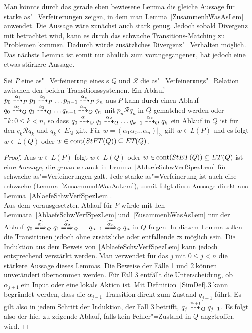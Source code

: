 Man könnte durch das gerade eben bewiesene Lemma die gleiche Aussage für starke
as"=Verfeinerungen zeigen, in dem man Lemma~\ref{ZusammenhWasAsLem} anwendet.
Die Aussage wäre zunächst auch stark genug. Jedoch sobald Divergenz mit
betrachtet wird, kann es durch das schwache Transitions-Matching zu Problemen
kommen. Dadurch würde zusätzliches Divergenz"=Verhalten möglich. Das nächste
Lemma ist somit nur ähnlich zum vorangegangenen, hat jedoch eine etwas
stärkere Aussage.

\begin{Lem}
  \label{AblaefeVerfSpezLem}
  Sei $P$ eine as"=Verfeinerung eines \MEIO{}s $Q$ und $\mathcal{R}$ die
  as"=Verfeinerungs"=Relation zwischen den beiden Transitionssystemen. Ein
  Ablauf $p_0 \may[\alpha _1]_P p_1 \may[\alpha _2]_P \dots p_{n-1} \may[\alpha
  _n]_P p_n$ aus $P$ kann durch einen Ablauf $q_0 \may[\alpha _1]_Q q_1
  \may[\alpha _2]_Q \dots q_{n-1} \may[\alpha _n]_Q q_n$ mit $p_n \mathcal{R}
  q_n$ in $Q$ gematched werden oder $\exists k: 0 \leq k < n$, so dass $q_0
  \may[\alpha _1]_Q q_1 \may[\alpha _2]_Q \dots q_{k-1} \may[\alpha _k]_Q q_k$
  ein Ablauf in $Q$ ist für den $q_k \mathcal{R} q_k$ und $q_k\in E_Q$ gilt.
  Für $w=(\alpha _1\alpha _2\dots\alpha _n)|_{\Sigma}$ gilt $w\in L(P)$ und es
  folgt $w\in L(Q)$ oder $w\in\mathrm{cont} (StET (Q))\subseteq ET (Q)$.
\end{Lem}
\begin{proof}
  Aus $w\in L(P)$ folgt $w\in L(Q)$ oder $w\in\mathrm{cont} (StET (Q))\subseteq ET
  (Q)$ ist eine Aussage, die genau so auch in
  Lemma~\ref{AblaefeSchwVerfSpezLem} für schwache as"=Verfeinerungen galt. Jede
  starke as"=Verfeinerung ist auch eine schwache
  (Lemma~\ref{ZusammenhWasAsLem}), somit folgt diese Aussage direkt aus
  Lemma~\ref{AblaefeSchwVerfSpezLem}.\\
  Aus dem vorausgesetzten Ablauf für $P$ würde mit den
  Lemmata~\ref{AblaefeSchwVerfSpezLem} und~\ref{ZusammenhWasAsLem} nur der
  Ablauf $q_0 \weakmay[\widehat{\alpha _1}]_Q q_1 \weakmay[\widehat{\alpha
  _2}]_Q \dots q_{n-1} \weakmay[\widehat{\alpha _n}]_Q q_n$ in $Q$ folgen. In
  diesem Lemma sollen die Transitionen jedoch ohne zusätzliche oder entfallende
  $\tau$s möglich sein. Die Induktion aus dem Beweis
  von~\ref{AblaefeSchwVerfSpezLem} kann jedoch entsprechend verstärkt werden.
  Man verwendet für das $j$ mit $0 \leq j < n$ die stärkere Aussage dieses
  Lemmas. Die Beweise der Fälle 1 und 2 können unverändert übernommen werden.
  Für Fall 3 entfällt die Unterscheidung, ob $\alpha _{j+1}$ ein Input oder
  eine lokale Aktion ist. Mit Definition~\ref{SimDef}.3 kann begründet werden,
  dass die $\alpha _{j+1}$-Transition direkt zum Zustand $q_{j+1}$ führt. Es
  gilt also in jedem Schritt der Induktion, der Fall 3 betrifft, $q_j
  \may[\alpha _{j+1}]_Q q_{j+1}$. Es folgt also der hier zu zeigende Ablauf,
  falls kein Fehler"=Zustand in $Q$ angetroffen wird.
\end{proof}

